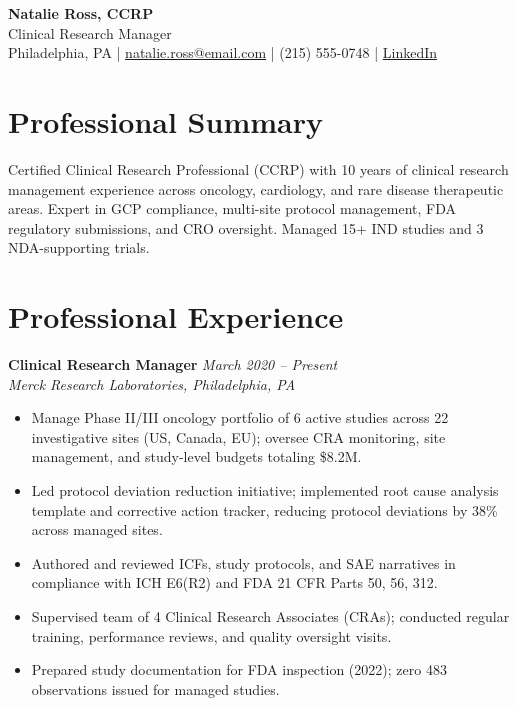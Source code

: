 \documentclass[11pt,a4paper]{article}
\begin{document}
\begin{center}
  {\LARGE \textbf{Natalie Ross, CCRP}}\\[3pt]
  Clinical Research Manager\\[4pt]
  Philadelphia, PA \quad|\quad
  \href{mailto:natalie.ross@email.com}{natalie.ross@email.com} \quad|\quad
  (215) 555-0748 \quad|\quad
  \href{https://linkedin.com/in/natalieross-crc}{LinkedIn}
\end{center}

\section{Professional Summary}
Certified Clinical Research Professional (CCRP) with 10 years of clinical research management experience across oncology, cardiology, and rare disease therapeutic areas. Expert in GCP compliance, multi-site protocol management, FDA regulatory submissions, and CRO oversight. Managed 15+ IND studies and 3 NDA-supporting trials.

\section{Professional Experience}

\noindent\textbf{Clinical Research Manager} \hfill \textit{March 2020 -- Present}\\
\textit{Merck Research Laboratories, Philadelphia, PA}
\begin{itemize}
  \item Manage Phase II/III oncology portfolio of 6 active studies across 22 investigative sites (US, Canada, EU); oversee CRA monitoring, site management, and study-level budgets totaling \$8.2M.
  \item Led protocol deviation reduction initiative; implemented root cause analysis template and corrective action tracker, reducing protocol deviations by 38\% across managed sites.
  \item Authored and reviewed ICFs, study protocols, and SAE narratives in compliance with ICH E6(R2) and FDA 21 CFR Parts 50, 56, 312.
  \item Supervised team of 4 Clinical Research Associates (CRAs); conducted regular training, performance reviews, and quality oversight visits.
  \item Prepared study documentation for FDA inspection (2022); zero 483 observations issued for managed studies.
\end{itemize}
\end{document}
